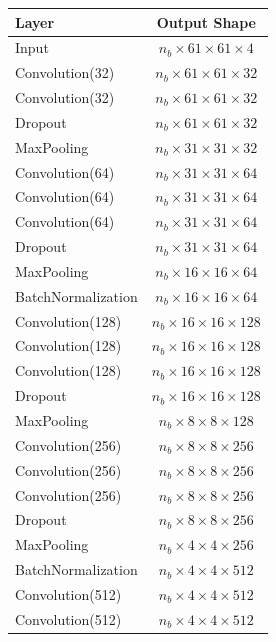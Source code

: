     \begin{table}[h!]
        \centering
        \begin{tabular}{ l | c  }
            Layer & Output Shape  \\ \hline
            Input & $n_b\times61\times61\times4$  \\
            Convolution(32) & $n_b\times61\times61\times32$  \\
            Convolution(32) & $n_b\times61\times61\times32$  \\
            Dropout & $n_b\times61\times61\times32$  \\
            MaxPooling & $n_b\times31\times31\times32$ \\
            Convolution(64) & $n_b\times31\times31\times64$  \\
            Convolution(64) & $n_b\times31\times31\times64$  \\
            Convolution(64) & $n_b\times31\times31\times64$  \\
            Dropout & $n_b\times31\times31\times64$  \\
            MaxPooling & $n_b\times16\times16\times64$ \\
            BatchNormalization & $n_b\times16\times16\times64$ \\
            Convolution(128) & $n_b\times16\times16\times128$  \\
            Convolution(128) & $n_b\times16\times16\times128$  \\
            Convolution(128) & $n_b\times16\times16\times128$  \\
            Dropout & $n_b\times16\times16\times128$  \\
            MaxPooling & $n_b\times8\times8\times128$ \\
            Convolution(256) & $n_b\times8\times8\times256$  \\
            Convolution(256) & $n_b\times8\times8\times256$  \\
            Convolution(256) & $n_b\times8\times8\times256$  \\
            Dropout & $n_b\times8\times8\times256$  \\
            MaxPooling & $n_b\times4\times4\times256$ \\
            BatchNormalization & $n_b\times4\times4\times512$  \\
            Convolution(512) & $n_b\times4\times4\times512$  \\
            Convolution(512) & $n_b\times4\times4\times512$  \\

\end{tabular}
\end{table}
